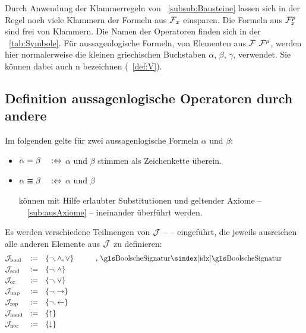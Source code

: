 Durch Anwendung der Klammerregeln von \subsubsectionname~\vref{subsub:Bausteine} lassen sich in der Regel noch viele Klammern der Formeln aus $\mathcal{F}_x$ einsparen.
Die Formeln aus $\mathcal{F}_x^p$ sind frei von Klammern.
Die Namen der Operatoren finden sich in der \tablename~\vref{tab:Symbole}.
Für aussagenlogische Formeln, \textdh von Elementen aus $\mathcal{F}$ \textbzw $\mathcal{F}^p$, werden hier normalerweise die kleinen griechischen Buchstaben $\alpha$, $\beta$, $\gamma$, \textusw verwendet.
Sie können dabei auch n bezeichnen (\seename~\eqref{def:V}).

\subsection{Definition aussagenlogische Operatoren durch andere}%
\label{sub:ausOperatorDef}

Im folgenden gelte für zwei aussagenlogische Formeln $\alpha$ und $\beta$:

\begin{itemize}

	\item[] $\alpha   =    \beta \quad :\Leftrightarrow$ \quad $\alpha$ und $\beta$
	stimmen als Zeichenkette überein.

	\item[] $\alpha \equiv \beta \quad :\Leftrightarrow$ \quad $\alpha$ und $\beta$
	\parbox[t]{11cm}{können mit Hilfe erlaubter Substitutionen und geltender Axiome -- \seename\ \subsectionname~\vref{sub:ausAxiome} -- ineinander überführt werden.}

\end{itemize}

Es werden verschiedene Teilmengen von $\mathcal{J}$ --  -- eingeführt, die jeweils ausreichen alle anderen Elemente aus $\mathcal{J}$ zu definieren:
\begin{align}
	& \asJ_\xBool &\defeq & & & \{ \lnot, \land, \lor \} \label{def:Jbool}
	& \formulaspace       & \text{, \glsIdx{BoolscheSignatur}}            \\
	& \asJ_\xAnd  &\defeq & & & \{ \lnot, \land       \} \label{def:Jand} \\
	& \asJ_\xOr   &\defeq & & & \{ \lnot, \lor        \} \label{def:Jor}  \\
	& \asJ_\xImp  &\defeq & & & \{ \lnot, \limp       \} \label{def:Jimp} \\
	& \asJ_\xRep  &\defeq & & & \{ \lnot, \lrep       \} \label{def:Jrep} \\
	& \asJ_\xNand &\defeq & & & \{ \lnand             \} \label{def:Jnand}\\
	& \asJ_\xNor  &\defeq & & & \{ \lnor              \} \label{def:Jnor}
	\formulatoleft
\end{align}

